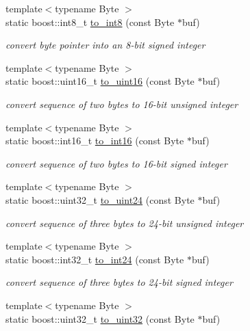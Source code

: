 \begin{DoxyCompactItemize}
{\footnotesize template$<$typename Byte $>$ }\\static boost\-::int8\-\_\-t \hyperlink{structpion_1_1algorithm_a884a55189c818f89a88ac6791e79de96}{to\-\_\-int8} (const Byte $\ast$buf)
\begin{DoxyCompactList}\small\item\em convert byte pointer into an 8-\/bit signed integer \end{DoxyCompactList}\item 
{\footnotesize template$<$typename Byte $>$ }\\static boost\-::uint16\-\_\-t \hyperlink{structpion_1_1algorithm_a009df038f511d87e4ccb89163305a42b}{to\-\_\-uint16} (const Byte $\ast$buf)
\begin{DoxyCompactList}\small\item\em convert sequence of two bytes to 16-\/bit unsigned integer \end{DoxyCompactList}\item 
{\footnotesize template$<$typename Byte $>$ }\\static boost\-::int16\-\_\-t \hyperlink{structpion_1_1algorithm_a8a5dc0884a7dd1deb53762947dce167c}{to\-\_\-int16} (const Byte $\ast$buf)
\begin{DoxyCompactList}\small\item\em convert sequence of two bytes to 16-\/bit signed integer \end{DoxyCompactList}\item 
{\footnotesize template$<$typename Byte $>$ }\\static boost\-::uint32\-\_\-t \hyperlink{structpion_1_1algorithm_ae54ebabcc5db708e1528c6afd4bb23fc}{to\-\_\-uint24} (const Byte $\ast$buf)
\begin{DoxyCompactList}\small\item\em convert sequence of three bytes to 24-\/bit unsigned integer \end{DoxyCompactList}\item 
{\footnotesize template$<$typename Byte $>$ }\\static boost\-::int32\-\_\-t \hyperlink{structpion_1_1algorithm_aa7faf5f422723c835e432e6c0bd43a71}{to\-\_\-int24} (const Byte $\ast$buf)
\begin{DoxyCompactList}\small\item\em convert sequence of three bytes to 24-\/bit signed integer \end{DoxyCompactList}\item 
{\footnotesize template$<$typename Byte $>$ }\\static boost\-::uint32\-\_\-t \hyperlink{structpion_1_1algorithm_ad8e9e4a781ab4c3903f53b771239bad3}{to\-\_\-uint32} (const Byte $\ast$buf)

\end{DoxyCompactItemize}
